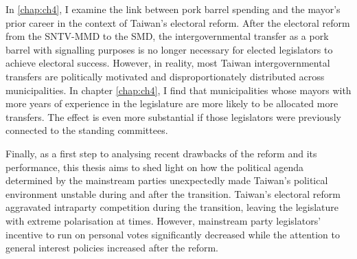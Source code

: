 In \autoref{chap:ch4}, I examine the link between pork barrel spending and the mayor's prior career in the context of Taiwan's electoral reform. After the electoral reform from the SNTV-MMD to the SMD, the intergovernmental transfer as a pork barrel with signalling purposes is no longer necessary for elected legislators to achieve electoral success. However, in reality, most Taiwan intergovernmental transfers are politically motivated and disproportionately distributed across municipalities. In chapter \ref{chap:ch4}, I find that municipalities whose mayors with more years of experience in the legislature are more likely to be allocated more transfers. The effect is even more substantial if those legislators were previously connected to the standing committees. 

Finally, as a first step to analysing recent drawbacks of the reform and its performance, this thesis aims to shed light on how the political agenda determined by the mainstream parties unexpectedly made Taiwan's political environment unstable during and after the transition. Taiwan's electoral reform aggravated intraparty competition during the transition, leaving the legislature with extreme polarisation at times. However, mainstream party legislators' incentive to run on personal votes significantly decreased while the attention to general interest policies increased after the reform. 


